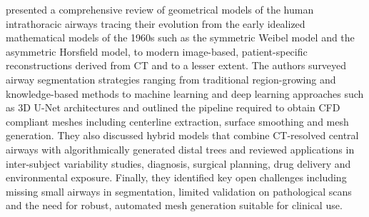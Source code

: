 \citet{pennati2024modeling} presented a comprehensive review of geometrical models of the
human intrathoracic airways tracing their evolution from the early idealized mathematical
models of the 1960s such as the symmetric Weibel model and the asymmetric Horsfield model,
to modern image-based, patient-specific reconstructions derived from CT and to a lesser
extent. The authors surveyed airway segmentation strategies ranging from traditional
region-growing and knowledge-based methods to machine learning and deep learning approaches
such as 3D U-Net architectures and outlined the pipeline required to obtain CFD compliant
meshes including centerline extraction, surface smoothing and mesh generation. They also
discussed hybrid models that combine CT-resolved central airways with algorithmically
generated distal trees and reviewed applications in inter-subject variability studies,
diagnosis, surgical planning, drug delivery and environmental exposure. Finally, they
identified key open challenges including missing small airways in segmentation, limited
validation on pathological scans and the need for robust, automated mesh generation suitable
for clinical use.



